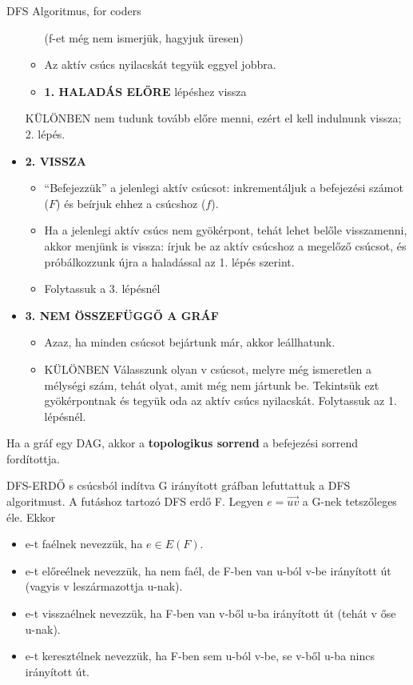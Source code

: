 \begin{tetel}{DFS Algoritmus, for coders}
\begin{itemize}
\begin{itemize}
    (f-et még nem ismerjük, hagyjuk üresen)

  \item Az aktív csúcs nyilacskát tegyük eggyel jobbra.

	\item \textbf{1. HALADÁS ELŐRE} lépéshez vissza
	\end{itemize}
    KÜLÖNBEN nem tudunk tovább előre menni, ezért el kell indulnunk vissza; 2. lépés.
\item{\textbf{2. VISSZA}}
  \begin{itemize}
  \item ``Befejezzük'' a jelenlegi aktív csúcsot: inkrementáljuk a befejezési számot ($F$) és beírjuk ehhez a csúcshoz ($f$).
  \item Ha a jelenlegi aktív csúcs nem gyökérpont, tehát lehet belőle visszamenni, akkor menjünk is vissza: írjuk be az aktív csúcshoz a megelőző csúcsot, és próbálkozzunk újra a haladással az 1. lépés szerint.
  \item Folytassuk a 3. lépésnél
  \end{itemize}
\item \textbf{3. NEM ÖSSZEFÜGGŐ A GRÁF}
  \begin{itemize}
  \item Azaz, ha minden csúcsot bejártunk már, akkor leállhatunk.
  \item KÜLÖNBEN Válasszunk olyan v csúcsot, melyre még ismeretlen a mélységi szám, tehát olyat, amit még nem jártunk be. Tekintsük ezt gyökérpontnak és tegyük oda az aktív csúcs nyilacskát. Folytassuk az 1. lépésnél.
  \end{itemize}
\end{itemize}

Ha a gráf egy DAG, akkor a \textbf{topologikus sorrend} a befejezési sorrend fordítottja.
\end{tetel}

\begin{definicio}{DFS-ERDŐ}
s csúcsból indítva G irányított gráfban lefuttattuk a DFS algoritmust. A futáshoz tartozó DFS erdő F. Legyen $e=\overrightarrow{uv}$ a G-nek tetszőleges éle. Ekkor
\begin{itemize}
\item e-t faélnek nevezzük, ha $e \in E(F)$.
\item e-t előreélnek nevezzük, ha nem faél, de F-ben van u-ból v-be irányított út (vagyis v leszármazottja u-nak).
\item e-t visszaélnek nevezzük, ha F-ben van v-ből u-ba irányított út (tehát v őse u-nak).
\item e-t keresztélnek nevezzük, ha F-ben sem u-ból v-be, se v-ből u-ba nincs irányított út.
\end{itemize}
\end{definicio}

